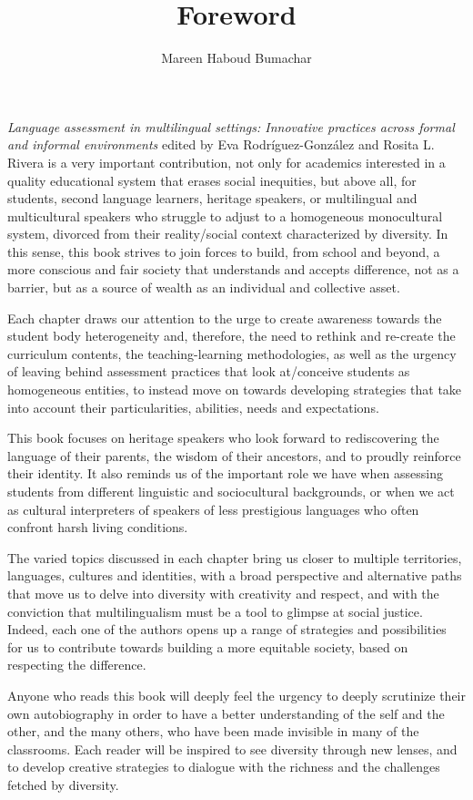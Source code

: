 \documentclass[output=paper]{langscibook}
\author{Mareen {Haboud Bumachar}\affiliation{Pontificia Universidad Católica del Ecuador; Ruhr-Universität Bochum}}
\title{Foreword}
\begin{document}
\maketitle

\noindent\textit{Language assessment in multilingual settings: Innovative practices across formal and informal environments} edited by Eva Rodríguez-González and Rosita L. Rivera is a very important contribution, not only for academics interested in a quality educational system that erases social inequities, but above all, for students, second language learners, heritage speakers, or multilingual and multicultural speakers who struggle to adjust to a homogeneous monocultural system, divorced from their reality\slash social context characterized by diversity. In this sense, this book strives to join forces to build, from school and beyond, a more conscious and fair society that understands and accepts difference, not as a barrier, but as a source of wealth as an individual and collective asset.

Each chapter draws our attention to the urge to create awareness towards the student body heterogeneity and, therefore, the need to rethink and re-create the curriculum contents, the teaching-learning methodologies, as well as the urgency of leaving behind assessment practices that look at\slash conceive students as homogeneous entities, to instead move on towards developing strategies that take into account their particularities, abilities, needs and expectations. 

This book focuses on heritage speakers who look forward to rediscovering the language of their parents, the wisdom of their ancestors, and to proudly reinforce their identity. It also reminds us of the important role we have when assessing students from different linguistic and sociocultural backgrounds, or when we act as cultural interpreters of speakers of less prestigious languages who often confront harsh living conditions.

The varied topics discussed in each chapter bring us closer to multiple territories, languages, cultures and identities, with a broad perspective and alternative paths that move us to delve into diversity with creativity and respect, and with the conviction that multilingualism must be a tool to glimpse at social justice. Indeed, each one of the authors opens up a range of strategies and possibilities for us to contribute towards building a more equitable society, based on respecting the difference. 

Anyone who reads this book will deeply feel the urgency to deeply scrutinize their own autobiography in order to have a better understanding of the self and the other, and the many others, who have been made invisible in many of the classrooms. Each reader will be inspired to see diversity through new lenses, and to develop creative strategies to dialogue with the richness and the challenges fetched by diversity.
\end{document}
